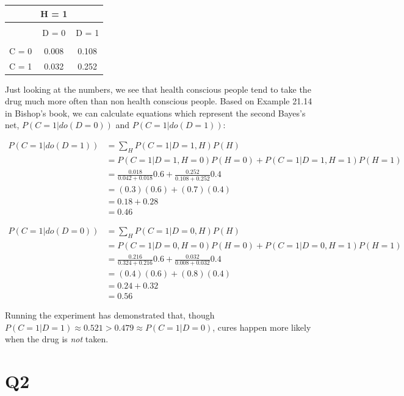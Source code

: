 \documentclass{article}
\begin{document}
\begin{tabular}{c | c c}
          & H = 1 & \\
    \hline \\
          & D = 0 & D = 1 \\
    \hline \\
    C = 0 & 0.008 & 0.108 \\
    C = 1 & 0.032 & 0.252 \\
\end{tabular}

Just looking at the numbers, we see that health conscious people tend to take 
the drug much more often than non health conscious people. Based on Example 
21.14 in Bishop's book, we can calculate equations which represent the second 
Bayes's net, $ P(C = 1 | do(D = 0)) $ and $ P(C = 1 | do(D = 1)) $:

\begin{align*}
P(C = 1 | do(D = 1)) &= \sum_H P(C = 1 | D = 1, H) P(H) \\
                    &= P(C = 1 | D = 1, H = 0) P(H = 0) + P(C = 1 | D = 1, H = 1) P(H = 1) \\
                    &= \frac{0.018}{0.042 + 0.018} 0.6 + \frac{0.252}{0.108 + 0.252} 0.4 \\
                    &= (0.3)(0.6) + (0.7)(0.4) \\
                    &= 0.18 + 0.28 \\
                    &= 0.46
\end{align*}

\begin{align*}
P(C = 1 | do(D = 0)) &= \sum_H P(C = 1 | D = 0, H) P(H) \\
                    &= P(C = 1 | D = 0, H = 0) P(H = 0) + P(C = 1 | D = 0, H = 1) P(H = 1) \\
                    &= \frac{0.216}{0.324 + 0.216} 0.6 + \frac{0.032}{0.008 + 0.032} 0.4 \\
                    &= (0.4)(0.6) + (0.8)(0.4) \\
                    &= 0.24 + 0.32 \\
                    &= 0.56
\end{align*}

Running the experiment has demonstrated that, 
though $ P(C = 1 | D = 1) \approx 0.521 > 0.479 \approx P(C = 1 | D = 0)$, 
cures happen more likely when the drug is \textit{not} taken.

\section{Q2}
\end{document}
